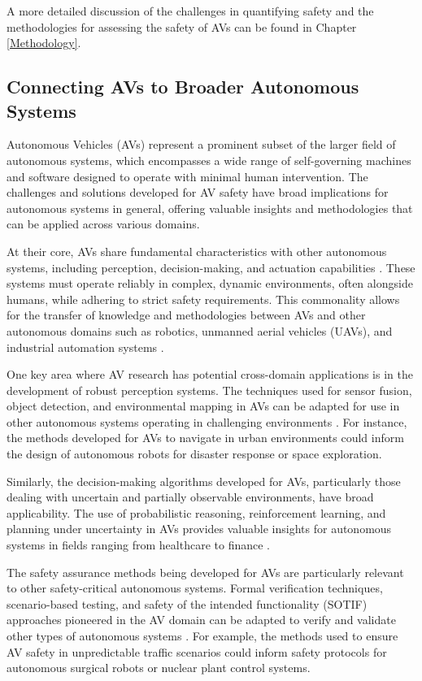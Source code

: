 A more detailed discussion of the challenges in quantifying safety and the methodologies for assessing the safety of AVs can be found in Chapter \ref{Methodology}.

\subsection{Connecting AVs to Broader Autonomous Systems}

Autonomous Vehicles (AVs) represent a prominent subset of the larger field of autonomous systems, which encompasses a wide range of self-governing machines and software designed to operate with minimal human intervention. The challenges and solutions developed for AV safety have broad implications for autonomous systems in general, offering valuable insights and methodologies that can be applied across various domains.

At their core, AVs share fundamental characteristics with other autonomous systems, including perception, decision-making, and actuation capabilities \cite{Scharre2018}. These systems must operate reliably in complex, dynamic environments, often alongside humans, while adhering to strict safety requirements. This commonality allows for the transfer of knowledge and methodologies between AVs and other autonomous domains such as robotics, unmanned aerial vehicles (UAVs), and industrial automation systems \cite{Kaber2018}.

One key area where AV research has potential cross-domain applications is in the development of robust perception systems. The techniques used for sensor fusion, object detection, and environmental mapping in AVs can be adapted for use in other autonomous systems operating in challenging environments \cite{Thrun2005}. For instance, the methods developed for AVs to navigate in urban environments could inform the design of autonomous robots for disaster response or space exploration.

Similarly, the decision-making algorithms developed for AVs, particularly those dealing with uncertain and partially observable environments, have broad applicability. The use of probabilistic reasoning, reinforcement learning, and planning under uncertainty in AVs provides valuable insights for autonomous systems in fields ranging from healthcare to finance \cite{Russell2015}.

The safety assurance methods being developed for AVs are particularly relevant to other safety-critical autonomous systems. Formal verification techniques, scenario-based testing, and safety of the intended functionality (SOTIF) approaches pioneered in the AV domain can be adapted to verify and validate other types of autonomous systems \cite{Koopman2019}. For example, the methods used to ensure AV safety in unpredictable traffic scenarios could inform safety protocols for autonomous surgical robots or nuclear plant control systems.

